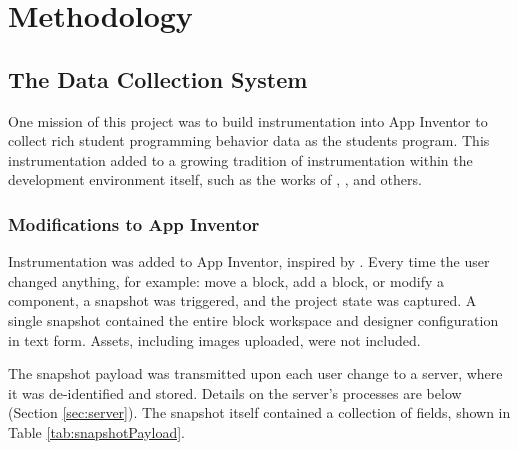 \chapter{Methodology}

\section{The Data Collection System}
One mission of this project was to build instrumentation into App Inventor to collect rich student programming behavior data as the students program. This instrumentation added to a growing tradition of instrumentation within the development environment itself, such as the works of \citet{berland-2013}, \citet{lipman-phd}, and others.

\subsection{Modifications to App Inventor}
\label{sec:mod-ai}
Instrumentation was added to App Inventor, inspired by \citet{piech-2012}. Every time the user changed anything, for example: move a block, add a block, or modify a component, a snapshot was triggered, and the project state was captured. A single snapshot contained the entire block workspace and designer configuration in text form. Assets, including images uploaded, were not included.

The snapshot payload was transmitted upon each user change to a server, where it was de-identified and stored. Details on the server's processes are below (Section \ref{sec:server}). The snapshot itself contained a collection of fields, shown in Table \ref{tab:snapshotPayload}. 



